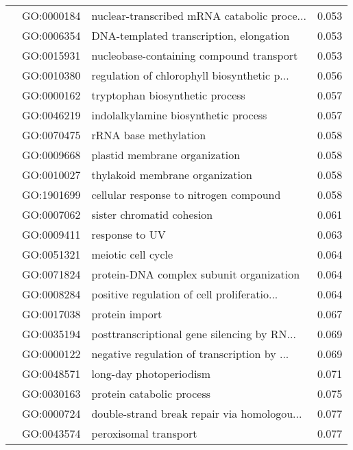 \begin{longtable}{lllr}
   & GO:0000184 &  nuclear-transcribed mRNA catabolic proce... &         0.053 \\
   & GO:0006354 &      DNA-templated transcription, elongation &         0.053 \\
   & GO:0015931 &     nucleobase-containing compound transport &         0.053 \\
   & GO:0010380 &  regulation of chlorophyll biosynthetic p... &         0.056 \\
   & GO:0000162 &              tryptophan biosynthetic process &         0.057 \\
   & GO:0046219 &         indolalkylamine biosynthetic process &         0.057 \\
   & GO:0070475 &                        rRNA base methylation &         0.058 \\
   & GO:0009668 &                plastid membrane organization &         0.058 \\
   & GO:0010027 &              thylakoid membrane organization &         0.058 \\
   & GO:1901699 &       cellular response to nitrogen compound &         0.058 \\
   & GO:0007062 &                    sister chromatid cohesion &         0.061 \\
   & GO:0009411 &                               response to UV &         0.063 \\
   & GO:0051321 &                           meiotic cell cycle &         0.064 \\
   & GO:0071824 &     protein-DNA complex subunit organization &         0.064 \\
   & GO:0008284 &  positive regulation of cell proliferatio... &         0.064 \\
   & GO:0017038 &                               protein import &         0.067 \\
   & GO:0035194 &  posttranscriptional gene silencing by RN... &         0.069 \\
   & GO:0000122 &  negative regulation of transcription by ... &         0.069 \\
   & GO:0048571 &                      long-day photoperiodism &         0.071 \\
   & GO:0030163 &                    protein catabolic process &         0.075 \\
   & GO:0000724 &  double-strand break repair via homologou... &         0.077 \\
   & GO:0043574 &                        peroxisomal transport &         0.077 \\

\end{longtable}
